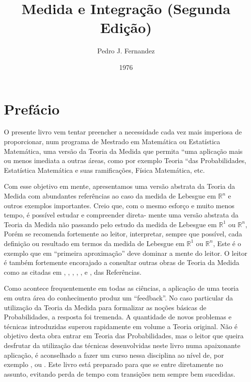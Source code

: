 \documentclass[
]{book}
\title{Medida e Integração (Segunda Edição)}
\author{Pedro J. Fernandez}
\date{1976}
\begin{document}
\maketitle

{
\setcounter{tocdepth}{1}
\tableofcontents
}
\chapter*{Prefácio}\label{prefuxe1cio}

O presente livro vem tentar preencher a necessidade cada vez mais imperiosa de proporcionar, num programa de Mestrado em Matemática ou Estatística Matemática, uma versão da Teoria da Medida que permita ``uma aplicação mais ou menos imediata a outras áreas, como por exemplo Teoria ``das Probabilidades, Estatística Matemática e suas ramificações, Física Matemática, etc.

Com esse objetivo em mente, apresentamos uma versão abstrata da Teoria da Medida com abundantes referências ao caso da medida de Lebesgue em \(\mathbb{R}^n\) e outros exemplos importantes. Creio que, com o mesmo esforço e muito menos tempo, é possível estudar e compreender direta- mente uma versão abstrata da Teoria da Medida não passando pelo estudo da medida de Lebesgue em \(\mathbb{R}^1\) ou \(\mathbb{R}^n\), Porém se recomenda fortemente ao leitor, interpretar, sempre que possível, cada definição ou resultado em termos da medida de Lebesgue em \(\mathbb{R}^1\) ou \(\mathbb{R}^n\), Este é o exemplo que em ``primeira aproximação'' deve dominar a mente do leitor. O leitor é também fortemente encorajado a consultar outras obras de Teoria da Medida como as citadas em , , , , ,  e , das Referências.

Como acontece frequentemente em todas as ciências, a aplicação de uma teoria em outra área do conhecimento produz um ``feedback''. No caso particular da utilização da Teoria da Medida para formalizar as noções básicas de Probabilidades, a resposta foi tremenda. A quantidade de novos problemas e técnicas introduzidas superou rapidamente em volume a Teoria original. Não é objetivo desta obra entrar em Teoria das Probabilidades, mas o leitor que queira desfrutar da utilização das técnicas desenvolvidas neste livro numa apaixonante aplicação, é aconselhado a fazer um curso nessa disciplina ao nível de, por exemplo ,  ou . Este livro está preparado para que se entre diretamente no assunto, evitando perda de tempo com transições nem sempre bem sucedidas.
\end{document}
